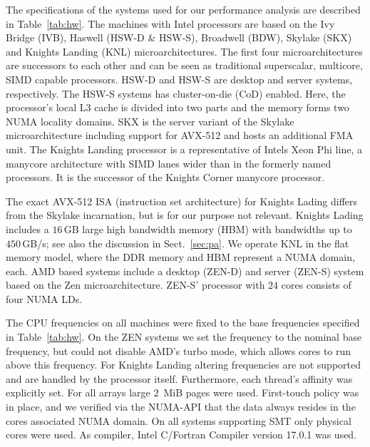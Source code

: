 The specifications of the systems used for our performance analysis are described
in Table~\ref{tab:hw}. 
%
The machines with Intel processors are based on the Ivy Bridge (IVB), Haswell
(HSW-D \& HSW-S), Broadwell (BDW), Skylake (SKX) and Knights Landing (KNL)
microarchitectures. 
The first four microarchitectures are successors to each other and can be seen
as traditional superscalar, multicore, SIMD capable processors.
HSW-D and HSW-S are desktop and server systems, respectively.
The HSW-S systems has cluster-on-die (CoD) enabled. 
Here, the processor's local L3 cache is divided into two parts and the memory
forms two NUMA locality domains.
%
SKX is the server variant of the Skylake microarchitecture including support for
AVX-512 and hosts an additional FMA unit.
%
The Knights Landing processor is
a representative of Intels Xeon Phi line, a manycore
architecture with SIMD lanes wider than in the formerly named processors.
It is the successor of the Knights Corner manycore processor.

The exact AVX-512 ISA (instruction set architecture) for Knights Lading differs from the Skylake incarnation,
but is for our purpose not relevant. 
Knights Lading includes a $16$\,GB large high bandwidth memory (HBM) with
bandwidths up to $450$\,GB/s; see also the discussion in Sect.~\ref{sec:pa}.
We operate KNL in the flat memory model, where the DDR memory and HBM 
represent a NUMA domain, each.
%
AMD based systems include a desktop (ZEN-D) and server (ZEN-S) system based on the Zen
microarchitecture. 
ZEN-S' processor with $24$ cores consists of four NUMA LDs.
%

The CPU frequencies on all machines were fixed to the base frequencies specified
in Table~\ref{tab:hw}.
On the ZEN systems we set the frequency to the nominal base frequency, but could
not disable AMD's turbo mode, which allows cores to run above this frequency.
For Knights Landing altering frequencies are not supported and are handled by the
processor itself.
%
Furthermore, each thread's affinity was explicitly set.
%
For all arrays large $2$~MiB pages were used.
%
First-touch policy was in place, and we verified via the NUMA-API that the data
always resides in the cores associated NUMA domain.
%
On all systems supporting SMT only physical cores were used.
%
As compiler, Intel C/Fortran Compiler version 17.0.1 was used.

